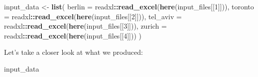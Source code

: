 \documentclass[]{book}
\newenvironment{Shaded}{\begin{snugshade}}{\end{snugshade}}
\newcommand{\DataTypeTok}[1]{\textcolor[rgb]{0.13,0.29,0.53}{#1}}
\newcommand{\DecValTok}[1]{\textcolor[rgb]{0.00,0.00,0.81}{#1}}
\newcommand{\KeywordTok}[1]{\textcolor[rgb]{0.13,0.29,0.53}{\textbf{#1}}}
\newcommand{\NormalTok}[1]{#1}
\newcommand{\OperatorTok}[1]{\textcolor[rgb]{0.81,0.36,0.00}{\textbf{#1}}}
\newcommand{\StringTok}[1]{\textcolor[rgb]{0.31,0.60,0.02}{#1}}
\begin{document}
\begin{Shaded}
\begin{Highlighting}[]
\NormalTok{input_data <-}
\StringTok{  }\KeywordTok{list}\NormalTok{(}
    \DataTypeTok{berlin =}\NormalTok{ readxl}\OperatorTok{::}\KeywordTok{read_excel}\NormalTok{(}\KeywordTok{here}\NormalTok{(input_files[[}\DecValTok{1}\NormalTok{]])),}
    \DataTypeTok{toronto =}\NormalTok{ readxl}\OperatorTok{::}\KeywordTok{read_excel}\NormalTok{(}\KeywordTok{here}\NormalTok{(input_files[[}\DecValTok{2}\NormalTok{]])),}
    \DataTypeTok{tel_aviv =}\NormalTok{ readxl}\OperatorTok{::}\KeywordTok{read_excel}\NormalTok{(}\KeywordTok{here}\NormalTok{(input_files[[}\DecValTok{3}\NormalTok{]])),}
    \DataTypeTok{zurich =}\NormalTok{ readxl}\OperatorTok{::}\KeywordTok{read_excel}\NormalTok{(}\KeywordTok{here}\NormalTok{(input_files[[}\DecValTok{4}\NormalTok{]]))}
\NormalTok{  )}
\end{Highlighting}
\end{Shaded}

Let's take a closer look at what we produced:

\begin{Shaded}
\begin{Highlighting}[]
\NormalTok{input_data}
\end{Highlighting}
\end{Shaded}
\end{document}

